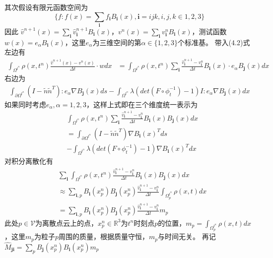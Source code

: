 其次假设有限元函数空间为$$\{f: f(x) = \sum_\mathbf{i} f_\mathbf{i} B_\mathbf{i}(x), \mathbf{i} = ijk, i,j,k\in{1,2,3}\}$$因此
$\hat{v}^{n+1}(x) = \sum_{\mathbf{i}}\hat{v}^{n+1}_{\mathbf{i}}B_{\mathbf{i}}(x)$，$v^n(x) = \sum_{\mathbf{i}}v^n_{\textbf{i}}B_{\textbf{i}}(x)$，测试函数$w(x) = e_{\alpha}B_{\mathbf{i}}(x)$，这里$e_{\alpha}$为三维空间的第$\alpha\in\{1,2,3\}$个标准基。
带入(4.2)式左边有
\begin{align}
    \int_{\Omega^{t^n}}\rho(x,t^n)\frac{\hat{v}^{n+1}(x) - v^n(x)}{\Delta t}\cdot w dx &=  \int_{\Omega^{t^n}} \rho(x,t^n)\sum_{\mathbf{i}}\frac{\hat{v}^{n+1}_\mathbf{i} - v^n_{\mathbf{i}}}{\Delta t}B_\mathbf{i}(x)\cdot e_{\alpha}B_{\mathbf{j}}(x)dx\nonumber
\end{align}
右边为
\begin{align}
    \int_{\partial \Omega^{t^n}} (I - \tilde{n}\tilde{n}^T):e_{\alpha}\nabla B_{\mathbf{j}}(x) ds - \int_{\Omega^{t^n}}\lambda (det(F\circ \phi_t^{-1}) - 1)I:e_{\alpha}\nabla B_\mathbf{j}(x) dx
\end{align}
如果同时考虑$e_{\alpha},\alpha = 1,2,3$，这样上式即在三个维度统一表示为
\begin{align}
    &\int_{\Omega^{t^n}}\rho(x,t^n)\sum_\mathbf{i} \frac{\hat{v}^{n+1}_\mathbf{i} - v^n_{\mathbf{i}}}{\Delta t}B_\mathbf{i}(x)B_\mathbf{j}(x)dx\nonumber\\
    &= \int_{\partial \Omega^{t^n}} (I - \tilde{n}\tilde{n}^T)\nabla B_{\mathbf{i}}(x)^T ds \nonumber\\
    & - \int_{\Omega^{t^n}} \lambda (det(F\circ \phi_t^{-1}) - 1)\nabla B_\mathbf{i}(x)^T dx
\end{align}
对积分离散化有
\begin{align}
    &\sum_\mathbf{i}\int_{\Omega^{t^n}}\rho(x,t^n) \frac{\hat{v}^{n+1}_\mathbf{i} - v^n_{\mathbf{i}}}{\Delta t}B_\mathbf{i}(x)B_\mathbf{j}(x)dx\nonumber\\ 
    &\approx \sum_{\mathbf{i},p}B_\mathbf{i}(x_p^n)B_\mathbf{j}(x_p^n)\frac{\hat{v}^{n+1}_\mathbf{i} - v^n_{\mathbf{i}}}{\Delta t}\int_{\Omega^{t^n}_p}\rho(x,t)dx\nonumber\\
    &= \sum_{\mathbf{i},p}B_\mathbf{i}(x_p^n)B_\mathbf{j}(x_p^n)\frac{\hat{v}^{n+1}_\mathbf{i} - v^n_{\mathbf{i}}}{\Delta t}m_p
\end{align}
此处$p\in \mathcal{V}$为离散点云上的点，$x_p^n\in \mathbb{R}^3$为$t^n$时刻点$p$的位置，$m_p = \int_{\Omega_p^{t^n}} \rho(x,t)dx$，这里$m_p$为粒子$p$周围的质量，根据质量守恒，$m_p$与时间无关。
再记$\hat{M}_{\mathbf{j}\mathbf{i}} = \sum_p B_{\mathbf{j}}(x_p^n)B_{\mathbf{i}}(x_p^n)m_p$
